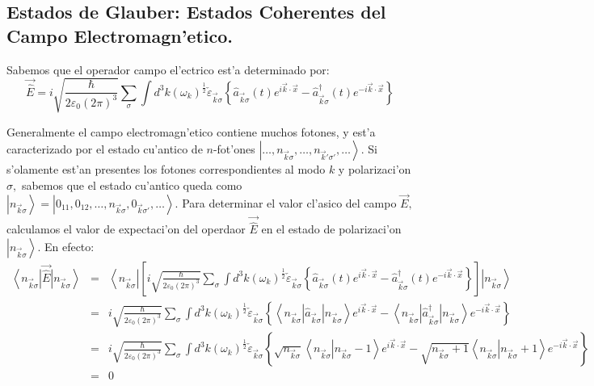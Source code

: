 \subsection{Estados de Glauber: Estados Coherentes del Campo
Electromagn'etico.}

Sabemos que el operador campo el'ectrico est'a determinado por:%
\begin{equation}
\overrightarrow{\hat{E}}=i\sqrt{\frac{\hbar}{2\varepsilon_{0}\left(
2\pi\right) ^{3}}}\sum_{\sigma}\int d^{3}k\left( \omega_{k}\right)
^{\frac{1}{2}}\check{\varepsilon}_{\vec{k}\sigma}\left\{ \hat{a}_{\vec
{k}\sigma}(t) e^{i\vec{k}\cdot\vec{x}}-\hat{a}_{\vec{k}\sigma
}^{\dagger}(t) e^{-i\vec{k}\cdot\vec{x}}\right\}
\end{equation}


Generalmente el campo electromagn'etico contiene muchos fotones, y est'a
caracterizado por el estado cu'antico de $n$-fot'ones $\left|
\dots,n_{\vec{k}\sigma},\dots,n_{\vec{k}'\sigma '},\dots\right> .$ Si s'olamente est'an presentes los fotones
correspondientes al modo $k$ y polarizaci'on $\sigma,$ sabemos que el
estado cu'antico queda como $\left| n_{\vec{k}\sigma}\right>
=\left| 0_{11},0_{12},\dots,n_{\vec{k}\sigma},0_{\vec{k}\sigma'},\dots\right> .$ Para determinar el valor cl'asico del campo $\vec
{E},$ calculamos el valor de expectaci'on del operdaor $\overrightarrow
{\hat{E}}$ en el estado de polarizaci'on $\left| n_{\vec{k}\sigma
}\right> .$ En efecto:%
\begin{eqnarray}
\left\langle n_{\vec{k}\sigma}\right| \overrightarrow{\hat{E}}\left|
n_{\vec{k}\sigma}\right> & = &\left\langle n_{\vec{k}\sigma}\right|
\left[ i\sqrt{\frac{\hbar}{2\varepsilon_{0}\left( 2\pi\right) ^{3}}}%
\sum_{\sigma}\int d^{3}k\left( \omega_{k}\right) ^{\frac{1}{2}}%
\check{\varepsilon}_{\vec{k}\sigma}\left\{ \hat{a}_{\vec{k}\sigma}\left(
t\right) e^{i\vec{k}\cdot\vec{x}}-\hat{a}_{\vec{k}\sigma}^{\dagger}\left(
t\right) e^{-i\vec{k}\cdot\vec{x}}\right\} \right] \left| n_{\vec
{k}\sigma}\right> \\
& = &i\sqrt{\frac{\hbar}{2\varepsilon_{0}\left( 2\pi\right) ^{3}}}\sum
_{\sigma}\int d^{3}k\left( \omega_{k}\right) ^{\frac{1}{2}}\check
{\varepsilon}_{\vec{k}\sigma}\left\{ \left\langle n_{\vec{k}\sigma
}\right| \hat{a}_{\vec{k}\sigma}\left| n_{\vec{k}\sigma}\right>
e^{i\vec{k}\cdot\vec{x}}-\left\langle n_{\vec{k}\sigma}\right| \hat
{a}_{\vec{k}\sigma}^{\dagger}\left| n_{\vec{k}\sigma}\right>
e^{-i\vec{k}\cdot\vec{x}}\right\} \\
& = &i\sqrt{\frac{\hbar}{2\varepsilon_{0}\left( 2\pi\right) ^{3}}}\sum
_{\sigma}\int d^{3}k\left( \omega_{k}\right) ^{\frac{1}{2}}\check
{\varepsilon}_{\vec{k}\sigma}\left\{ \sqrt{n_{\vec{k}\sigma}}\left\langle
n_{\vec{k}\sigma}\right| \left. n_{\vec{k}\sigma}-1\right>
e^{i\vec{k}\cdot\vec{x}}-\sqrt{n_{\vec{k}\sigma}+1}\left\langle n_{\vec
{k}\sigma}\right| \left. n_{\vec{k}\sigma}+1\right> e^{-i\vec
{k}\cdot\vec{x}}\right\} \\
& = &0
\end{eqnarray}
